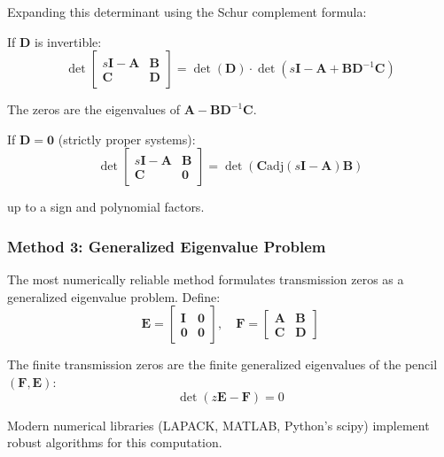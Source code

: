 Expanding this determinant using the Schur complement formula:

If $\mathbf{D}$ is invertible:
\begin{equation}
\det\begin{bmatrix} s\mathbf{I} - \mathbf{A} & \mathbf{B} \\ \mathbf{C} & \mathbf{D} \end{bmatrix} = \det(\mathbf{D}) \cdot \det\left(s\mathbf{I} - \mathbf{A} + \mathbf{B}\mathbf{D}^{-1}\mathbf{C}\right)
\end{equation}

The zeros are the eigenvalues of $\mathbf{A} - \mathbf{B}\mathbf{D}^{-1}\mathbf{C}$.

If $\mathbf{D} = \mathbf{0}$ (strictly proper systems):
\begin{equation}
\det\begin{bmatrix} s\mathbf{I} - \mathbf{A} & \mathbf{B} \\ \mathbf{C} & \mathbf{0} \end{bmatrix} = \det(\mathbf{C}\text{adj}(s\mathbf{I} - \mathbf{A})\mathbf{B})
\end{equation}

up to a sign and polynomial factors.

\subsubsection{Method 3: Generalized Eigenvalue Problem}

The most numerically reliable method formulates transmission zeros as a generalized eigenvalue problem. Define:
\begin{equation}
\mathbf{E} = \begin{bmatrix} \mathbf{I} & \mathbf{0} \\ \mathbf{0} & \mathbf{0} \end{bmatrix}, \quad
\mathbf{F} = \begin{bmatrix} \mathbf{A} & \mathbf{B} \\ \mathbf{C} & \mathbf{D} \end{bmatrix}
\end{equation}

The finite transmission zeros are the finite generalized eigenvalues of the pencil $(\mathbf{F}, \mathbf{E})$:
\begin{equation}
\det(z\mathbf{E} - \mathbf{F}) = 0
\end{equation}

Modern numerical libraries (LAPACK, MATLAB, Python's scipy) implement robust algorithms for this computation.

